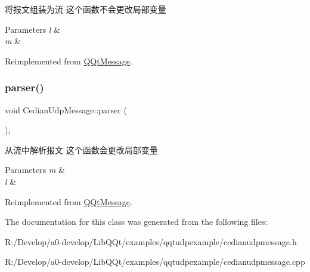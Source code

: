 将报文组装为流 这个函数不会更改局部变量 


\begin{DoxyParams}{Parameters}
{\em l} & \\
\hline
{\em m} & \\
\hline
\end{DoxyParams}


Reimplemented from \mbox{\hyperlink{class_q_qt_message_af1885c2c3628495808dca66ee8d72e14}{Q\+Qt\+Message}}.

\mbox{\label{class_cedian_udp_message_a7809bad122cec1a2eace34a9cad76f2b}} 
\subsubsection{\texorpdfstring{parser()}{parser()}}
{\footnotesize\ttfamily void Cedian\+Udp\+Message\+::parser (\begin{DoxyParamCaption}\item[{const Q\+Byte\+Array \&}]{ }\end{DoxyParamCaption})\hspace{0.3cm}{\ttfamily [override]}, {\ttfamily [virtual]}}



从流中解析报文 这个函数会更改局部变量 


\begin{DoxyParams}{Parameters}
{\em m} & \\
\hline
{\em l} & \\
\hline
\end{DoxyParams}


Reimplemented from \mbox{\hyperlink{class_q_qt_message_a0bc25669bdd61490b1d8df6d77565f31}{Q\+Qt\+Message}}.



The documentation for this class was generated from the following files\+:\begin{DoxyCompactItemize}
\item 
R\+:/\+Develop/a0-\/develop/\+Lib\+Q\+Qt/examples/qqtudpexample/cedianudpmessage.\+h\item 
R\+:/\+Develop/a0-\/develop/\+Lib\+Q\+Qt/examples/qqtudpexample/cedianudpmessage.\+cpp\end{DoxyCompactItemize}
